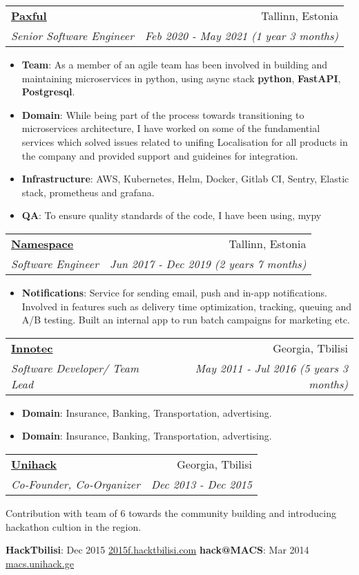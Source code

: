 \documentclass[letterpaper,11pt]{article}
\makeatletter
\newcommand{\resumeItem}[2]{
  \item\small{
    \textbf{#1}{: #2 \vspace{-2pt}}
  }
}
\newcommand{\resumeSubheading}[4]{
  \vspace{-1pt}\item
    \begin{tabular*}{0.97\textwidth}{l@{\extracolsep{\fill}}r}
      \textbf{#1} & #2 \\
      \textit{\small#3} & \textit{\small #4} \\
    \end{tabular*}\vspace{-5pt}
}
\newcommand{\resumeItemListStart}{\begin{itemize}}
\newcommand{\resumeItemListEnd}{\end{itemize}\vspace{-5pt}}
\makeatother
\begin{document}
\resumeSubheading
      {\href{https://paxful.com}{\underline{Paxful}}}{Tallinn, Estonia}
      {Senior Software Engineer}{Feb 2020 - May 2021 (1 year 3 months)}
      \resumeItemListStart
        \resumeItem{Team}
          {As a member of an agile team has been involved in building and maintaining microservices in python, using async stack \textbf{python}, \textbf{FastAPI}, \textbf{Postgresql}.}
        \resumeItem{Domain}{While being part of the process towards transitioning to microservices architecture, I have worked on some of the fundamential services which solved issues related to unifing Localisation for all products in the company and provided support and guideines for integration.}
        \resumeItem{Infrastructure}
          {AWS, Kubernetes, Helm, Docker, Gitlab CI, Sentry, Elastic stack, prometheus and grafana.}
		\resumeItem{QA}
          {To ensure quality standards of the code, I have been using, mypy }
      \resumeItemListEnd

    \resumeSubheading
      {\href{https://namespace.ee}{\underline{Namespace}}}{Tallinn, Estonia}
      {Software Engineer}{Jun 2017 - Dec 2019 (2 years 7 months)}
      \resumeItemListStart
        \resumeItem{Notifications}
          {Service for sending email, push and in-app notifications. Involved in features such as delivery time optimization, tracking, queuing and A/B testing. Built an internal app to run batch campaigns for marketing etc.}
      \resumeItemListEnd

    \resumeSubheading
      {\href{http://innotec.ge/}{\underline{Innotec}}}{Georgia, Tbilisi}
      {Software Developer/ Team Lead}{May 2011 - Jul 2016 (5 years 3 months)}
      \resumeItemListStart
        \resumeItem{Domain}
          {Insurance, Banking, Transportation, advertising.}
        \resumeItem{Domain}
          {Insurance, Banking, Transportation, advertising.}
      \resumeItemListEnd
      
     \resumeSubheading
      {\href{https://www.facebook.com/unihackge/}{\underline{Unihack}}}{Georgia, Tbilisi}
      {Co-Founder, Co-Organizer}{Dec 2013 - Dec 2015}

		Contribution with team of 6 towards the community building and introducing hackathon cultion in the region.

     \textbf{HackTbilisi}{: Dec 2015 \href{https://www.facebook.com/events/684989148311419/}{\underline{2015f.hacktbilisi.com}}}
     \hfill
     \textbf{hack@MACS}{: Mar 2014 \href{https://www.facebook.com/events/449121528548787/}{\underline{macs.unihack.ge}}}
     
\end{document}
